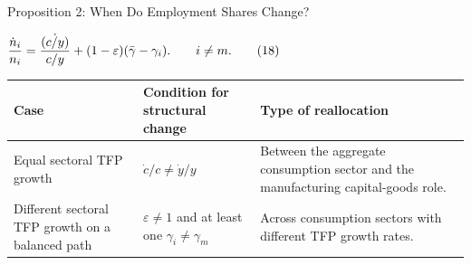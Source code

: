 \begin{frame}{Proposition 2: When Do Employment Shares Change?}
  \footnotesize
  \begin{center}
    {\color{black}%
    \(\displaystyle
      \frac{\dot n_i}{n_i}
      =
      \frac{\dot{(c/y)}}{c/y}
      +(1-\varepsilon)(\bar{\gamma}-\gamma_i).
      \qquad i\neq m .
      \qquad (18)
    \)}
  \end{center}

  \vspace{0.06cm}
  \begin{tabularx}{\textwidth}{@{}p{}X X@{}}
    \toprule
    Case & Condition for structural change & Type of reallocation \\
    \midrule
    Equal sectoral TFP growth
      & $\dot c/c\neq \dot y/y$
      & Between the aggregate consumption sector and the manufacturing capital-goods role. \\
    Different sectoral TFP growth on a balanced path
      & $\varepsilon\neq 1$ and at least one $\gamma_i\neq\gamma_m$
      & Across consumption sectors with different TFP growth rates. \\
    \bottomrule
  \end{tabularx}
\end{frame}

